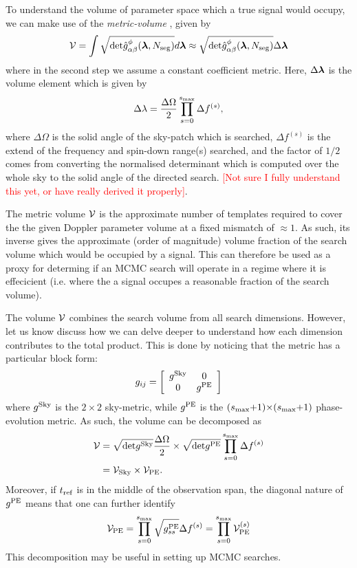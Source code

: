 \documentclass[aps, prd, twocolumn, superscriptaddress, floatfix, showpacs, nofootinbib, longbibliography]{revtex4-1}
\newcommand{\comment}[1]{\textcolor{red}{[#1]}}
\begin{document}
To understand the volume of parameter space which a true signal would occupy,
we can make use of the \emph{metric-volume} \citep{prix2007}, given by
\begin{align}
\mathcal{V} = \int 
\sqrt{\textrm{det}\hat{g}^{\phi}_{\alpha\beta}(\boldsymbol{\mathbf{\lambda}}, N_{\rm seg})} d\boldsymbol{\mathbf{\lambda}} \approx 
\sqrt{\textrm{det}\hat{g}^{\phi}_{\alpha\beta}(\boldsymbol{\mathbf{\lambda}}, N_{\rm seg})} \Delta\boldsymbol{\mathbf{\lambda}}
\end{align}
where in the second step we assume a constant coefficient metric. Here, $\Delta
\boldsymbol{\mathbf{\lambda}}$ is the volume element which is given by 
\begin{equation}
\Delta\lambda = \frac{\Delta\Omega}{2}
\prod_{s=0}^{s_{\textrm{max}}} \Delta f^{(s)},
\end{equation}
where $\Delta\Omega$ is the solid angle of the sky-patch which is searched,
$\Delta f^(s)$ is the extend of the frequency and spin-down range(s) searched,
and the factor of $1/2$ comes from converting the normalised determinant which
is computed over the whole sky to the solid angle of the directed search.
\comment{Not sure I fully understand this yet, or have really derived it properly}.

The metric volume $\mathcal{V}$ is the approximate number of templates required to cover
the the given Doppler parameter volume at a fixed mismatch of $\approx 1$. As
such, its inverse gives the approximate (order of magnitude) volume fraction of
the search volume which would be occupied by a signal. This can therefore be
used as a proxy for determing if an MCMC search will operate in a regime where
it is effecicient (i.e. where the a signal occupes a reasonable fraction of the
search volume).

The volume $\mathcal{V}$ combines the search volume from all search dimensions. However,
let us know discuss how we can delve deeper to understand how each dimension
contributes to the total product. This is done by noticing that the metric has
a particular block form:
\begin{align}
g_{ij} = \left[
\begin{array}{cc}
g^{\rm Sky} & 0 \\
0 & g^{\rm PE}
\end{array}
\right]
\end{align}
where $g^{\rm Sky}$ is the $2\times2$ sky-metric, while $g^{\rm PE}$ is the
$(s_{\textrm{max}}{+}1){\times}(s_{\textrm{max}}{+}1)$ phase-evolution metric.
As such, the volume can be decomposed as
\begin{align}
\mathcal{V} & =
\sqrt{\textrm{det}g^{\rm Sky}}\frac{\Delta\Omega}{2} \times
\sqrt{\textrm{det}g^{\rm PE}}\prod_{s=0}^{s_{\textrm{max}}}\Delta f^{(s)} \\
& = \mathcal{V}_{\rm Sky} \times \mathcal{V}_{\rm PE}.
\label{eqn_metric_volume}
\end{align}
Moreover, if $t_{\rm ref}$ is in the middle of the observation span, the diagonal
nature of $g^{\rm PE}$ means that one can further identify
\begin{align}
\mathcal{V}_{\rm PE} = \prod_{s=0}^{s_{\textrm{max}}}\sqrt{g^{\rm PE}_{ss}} \Delta f^{(s)}
= \prod_{s=0}^{s_{\textrm{max}}}\mathcal{V}_{\rm PE}^{(s)}
\end{align}
This decomposition may be useful in setting up MCMC searches.
\end{document}
